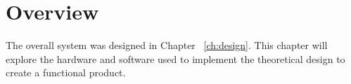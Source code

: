 \section{Overview}
	The overall system was designed in Chapter ~\ref{ch:design}. This chapter will explore the hardware and software used to implement the theoretical design to create a functional product.